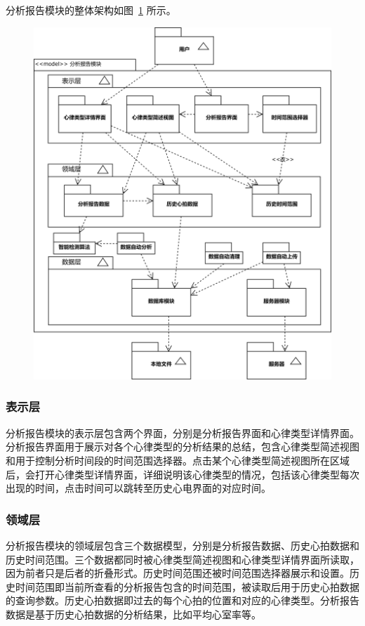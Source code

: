 分析报告模块的整体架构如图~\ref{fig:model-analytics} 所示。

\begin{figure}[!ht]
    \centering
    \includegraphics[width=.8\textwidth]{../assets/model-analytics.drawio}
    \label{fig:model-analytics}
\end{figure}

\subsubsection{表示层}

分析报告模块的表示层包含两个界面，分别是分析报告界面和心律类型详情界面。分析报告界面用于展示对各个心律类型的分析结果的总结，包含心律类型简述视图和用于控制分析时间段的时间范围选择器。点击某个心律类型简述视图所在区域后，会打开心律类型详情界面，详细说明该心律类型的情况，包括该心律类型每次出现的时间，点击时间可以跳转至历史心电界面的对应时间。

\subsubsection{领域层}

分析报告模块的领域层包含三个数据模型，分别是分析报告数据、历史心拍数据和历史时间范围。三个数据都同时被心律类型简述视图和心律类型详情界面所读取，因为前者只是后者的折叠形式。历史时间范围还被时间范围选择器展示和设置。历史时间范围即当前所查看的分析报告包含的时间范围，被读取后用于历史心拍数据的查询参数。历史心拍数据即过去的每个心拍的位置和对应的心律类型。分析报告数据是基于历史心拍数据的分析结果，比如平均心室率等。

